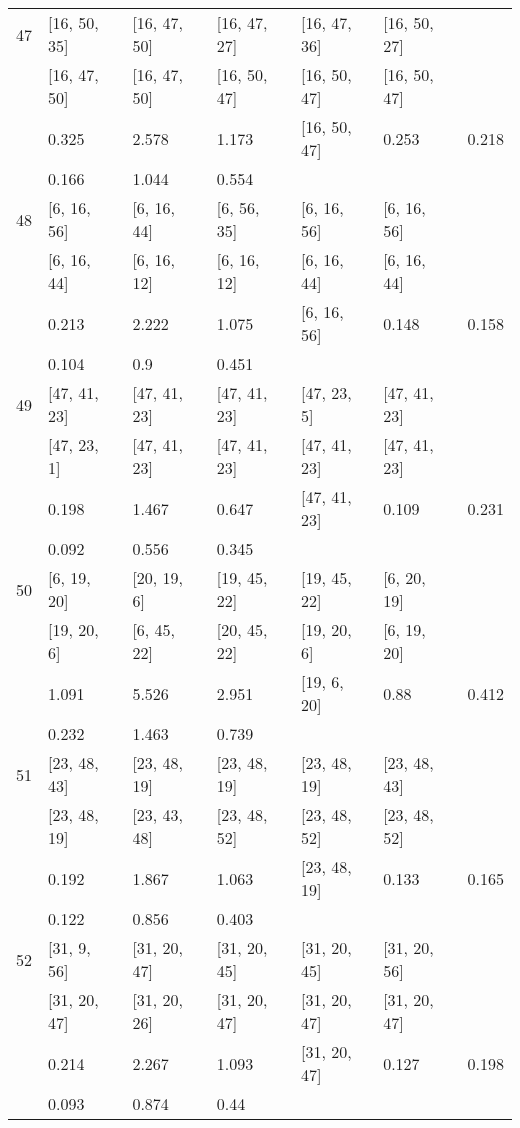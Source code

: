 \begin{longtable}{| l || l | l | l | l | l | l | }
\hline
47  & [16, 50, 35] & [16, 47, 50] & [16, 47, 27] & [16, 47, 36] & [16, 50, 27] \\
 & [16, 47, 50] & [16, 47, 50] & [16, 50, 47] & [16, 50, 47] & [16, 50, 47]\\
\hline
& 0.325 & 2.578 & 1.173 & [16, 50, 47] & 0.253 & 0.218\\
\hline
& 0.166 & 1.044 & 0.554 \\
\hline

\hline
48  & [6, 16, 56] & [6, 16, 44] & [6, 56, 35] & [6, 16, 56] & [6, 16, 56] \\
 & [6, 16, 44] & [6, 16, 12] & [6, 16, 12] & [6, 16, 44] & [6, 16, 44]\\
\hline
& 0.213 & 2.222 & 1.075 & [6, 16, 56] & 0.148 & 0.158\\
\hline
& 0.104 & 0.9 & 0.451 \\
\hline

\hline
49  & [47, 41, 23] & [47, 41, 23] & [47, 41, 23] & [47, 23, 5] & [47, 41, 23] \\
 & [47, 23, 1] & [47, 41, 23] & [47, 41, 23] & [47, 41, 23] & [47, 41, 23]\\
\hline
& 0.198 & 1.467 & 0.647 & [47, 41, 23] & 0.109 & 0.231\\
\hline
& 0.092 & 0.556 & 0.345 \\
\hline

\hline
50  & [6, 19, 20] & [20, 19, 6] & [19, 45, 22] & [19, 45, 22] & [6, 20, 19] \\
 & [19, 20, 6] & [6, 45, 22] & [20, 45, 22] & [19, 20, 6] & [6, 19, 20]\\
\hline
& 1.091 & 5.526 & 2.951 & [19, 6, 20] & 0.88 & 0.412\\
\hline
& 0.232 & 1.463 & 0.739 \\
\hline

\hline
51  & [23, 48, 43] & [23, 48, 19] & [23, 48, 19] & [23, 48, 19] & [23, 48, 43] \\
 & [23, 48, 19] & [23, 43, 48] & [23, 48, 52] & [23, 48, 52] & [23, 48, 52]\\
\hline
& 0.192 & 1.867 & 1.063 & [23, 48, 19] & 0.133 & 0.165\\
\hline
& 0.122 & 0.856 & 0.403 \\
\hline

\hline
52  & [31, 9, 56] & [31, 20, 47] & [31, 20, 45] & [31, 20, 45] & [31, 20, 56] \\
 & [31, 20, 47] & [31, 20, 26] & [31, 20, 47] & [31, 20, 47] & [31, 20, 47]\\
\hline
& 0.214 & 2.267 & 1.093 & [31, 20, 47] & 0.127 & 0.198\\
\hline
& 0.093 & 0.874 & 0.44 \\
\hline


\end{longtable}
